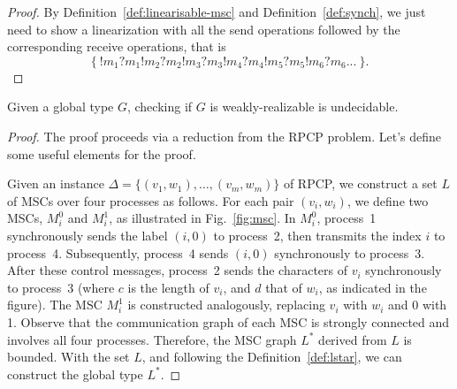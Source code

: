 \begin{proof}
By Definition~\ref{def:linearisable-msc} and Definition~\ref{def:synch},
we just need to show a linearization with all the send operations
followed by the corresponding receive operations, that is
$$
\{~!m_1?m_1!m_2?m_2!m_3?m_3!m_4?m_4!m_5?m_5!m_6?m_6...~\}.
$$
\end{proof}

\begin{theorem}
Given a global type $G$, checking if $G$ is weakly-realizable is undecidable.
\end{theorem}

\begin{proof}
The proof proceeds via a reduction from the RPCP problem. Let's define some useful
elements for the proof.

Given an instance $\Delta = \{(v_1, w_1), \ldots, (v_m, w_m)\}$ of RPCP, we  
construct a set $L$ of MSCs over four processes as follows. For each pair  
$(v_i, w_i)$, we define two MSCs, $M^0_i$ and $M^1_i$, as illustrated in  
Fig.~\ref{fig:msc}.  
In $M^0_i$, process~1 synchronously sends the label $(i, 0)$ to process~2,  
then transmits the index $i$ to process~4. Subsequently, process~4 sends  
$(i, 0)$ synchronously to process~3. After these control messages, process~2  
sends the characters of $v_i$ synchronously to process~3 (where $c$ is the  
length of $v_i$, and $d$ that of $w_i$, as indicated in the figure).  
The MSC $M^1_i$ is constructed analogously, replacing $v_i$ with $w_i$ and
0 with 1.  
Observe that the communication graph of each MSC is strongly connected and  
involves all four processes. Therefore, the MSC graph $L^*$ derived from $L$  
is bounded. With the set $L$, and following the Definition~\ref{def:lstar},
we can construct the global type $L^*$.




\end{proof}
